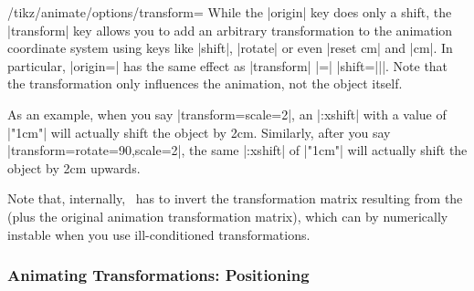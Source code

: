 \begin{key}{/tikz/animate/options/transform=}
  While the |origin| key does only a shift, the |transform| key allows
  you to add an arbitrary transformation to the animation coordinate
  system using keys like |shift|, |rotate| or even |reset cm| and
  |cm|. In particular, |origin=| has the same effect as
  |transform| |=| |{shift=||}|. Note that the transformation
  only influences the animation, not the object itself.

  As an example, when you say |transform={scale=2}|, an |:xshift| with
  a value of |"1cm"| will actually shift the object by 2cm. Similarly,
  after you say |transform={rotate=90,scale=2}|, the same |:xshift| of
  |"1cm"| will actually shift the object by 2cm upwards.

  Note that, internally, \tikzname\ has to invert the transformation
  matrix resulting from the  (plus the
  original animation transformation matrix), which can by numerically
  instable when you use ill-conditioned transformations.
\begin{codeexample}[animation list={0.5,1,1.5,2}]
\end{codeexample}
\begin{codeexample}[animation list={0.5,1,1.5,2}]
\end{codeexample}
\end{key}



\subsubsection{Animating Transformations: Positioning}

